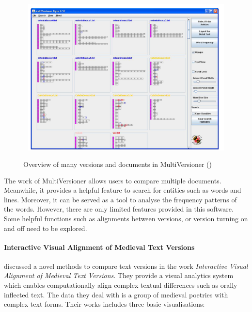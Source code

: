 \begin{figure}[h]
	\centering	
	\includegraphics[width=13cm, height=8cm]{Figs/MultiVersioner}\\[1ex]
	\caption{Overview of many versions and documents in MultiVersioner (\cite{Jong2008})}
	\label{fig:multiVersioner}
\end{figure} 

The work of MultiVersioner allows users to compare multiple documents. Meanwhile, it provides a helpful feature to search for entities such as words and lines. Moreover, it can be served as a tool to analyse the frequency patterns of the words. However, there are only limited features provided in this software. Some helpful functions such as alignments between versions, or version turning on and off need to be explored.

\paragraph{Interactive Visual Alignment of Medieval Text Versions}
\paragraph[]{}

\cite{Stefan2017} discussed a novel methods to compare text versions in the work \emph{Interactive Visual Alignment of Medieval Text Versions}. They provide a visual analytics system which enables computationally align complex textual differences such as orally inflected text. The data they deal with is a group of medieval poetries with complex text forms. Their works includes three basic visualisations:

